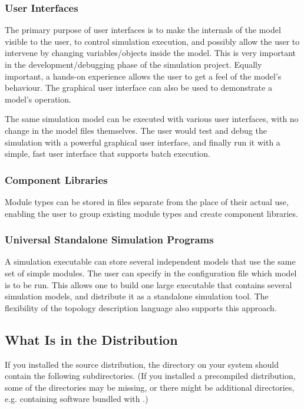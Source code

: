 \subsubsection{User Interfaces}

The primary purpose of user interfaces is to make the internals
of the model visible to the user, to control simulation execution,
and possibly allow the user to intervene by changing variables/objects
inside the model. This is very important in the development/debugging
phase of the simulation project. Equally important, a hands-on
experience allows the user to get a feel of the model's
behaviour. The graphical user interface can also be used to
demonstrate a model's operation.


The same simulation model can be executed with various user
interfaces, with no change in the model files themselves.
The user would test and debug the simulation with a powerful
graphical user interface, and finally run it with a simple,
fast user interface that supports batch execution.


\subsubsection{Component Libraries}

Module types can be stored in files separate from the place
of their actual use, enabling the user to group existing
module types and create component libraries.


\subsubsection{Universal Standalone Simulation Programs}


A simulation executable can store several independent models
that use the same set of simple modules. The user can specify
in the configuration file which model is to be run. This
allows one to build one large executable that contains several
simulation models, and distribute it as a standalone simulation
tool. The flexibility of the topology description language also
supports this approach.


\subsection{What Is in the Distribution}

If you installed the source distribution, the {\opp} directory on your system
should contain the following subdirectories. (If you installed a precompiled
distribution, some of the directories may be missing, or there might be
additional directories, e.g. containing software bundled with {\opp}.)

